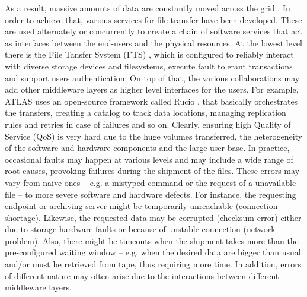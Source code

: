 
As a result, massive amounts of data are constantly moved across the grid%
. 
In order to achieve that, various services for file transfer have been developed. These are used alternately or concurrently to create a chain of software services that act as interfaces between the end-users and the physical resources.
At the lowest level there is the File Tansfer System (FTS) \cite{karavakis2020fts}, which is configured to reliably interact with diverse storage devices and filesystems, execute fault tolerant transactions and support users authentication.
On top of that, the various collaborations may add other middleware layers as higher level interfaces for the users.
For example, ATLAS uses an open-source framework called Rucio \cite{barisits2019rucio}, that basically orchestrates the transfers, creating a catalog to track data locations, managing replication rules and retries in case of failures and so on.
Clearly, ensuring high Quality of Service (QoS) is very hard due to the huge volumes transferred, the heterogeneity of the software and hardware components and the large user base.
In practice, occasional faults may happen at various levels and may include a wide range of root causes, provoking failures during the shipment of the files.
These errors may vary from naive ones -- e.g. a mistyped command or the request of a unavailable file -- to more severe software and hardware defects.
For instance, the requesting endpoint or archiving server might be temporarily unreachable (connection shortage).
Likewise, the requested data may be corrupted (checksum error) either due to storage hardware faults or because of unstable connection (network problem).
Also, there might be timeouts when the shipment takes more than the pre-configured waiting window -- e.g. when the desired data are bigger than usual and/or must be retrieved from tape, thus requiring more time.
In addition, errors of different nature may often arise due to the interactions between different middleware layers.
